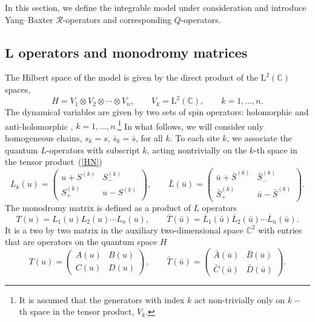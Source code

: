 \documentclass[pdftex]{sigma}
\numberwithin{equation}{section}
\begin{document}
In this section, we define the integrable model under
consideration and introduce Yang--Baxter $\mathcal{R}$-operators
and corresponding $Q$-operators.

\subsection[L operators and monodromy matrices]{$\boldsymbol{L}$ operators and monodromy matrices}

The Hilbert space of the model is given by the direct product of the $\mathrm{L}^2(\mathbb{C})$ spaces,
\begin{equation}\label{HN}
H=V_1\otimes V_2\otimes\cdots\otimes V_n, \qquad V_k=\mathrm{L}^2(\mathbb{C}) ,\qquad
k=1,\dots,n.
\end{equation}
The dynamical variables are given by two sets of spin operators: holomorphic
 and anti-holomorphic
,
$k=1,\dots,n$.\footnote{It is assumed that the
generators with index $k$ act non-trivially
only on $k-$th space in the tensor product, $V_k$.}
In what follows, we will consider only homogeneous chains, $s_k=s$, $\bar s_k=\bar s$, for all $k$.
To each site $k$, we associate the quantum $L$-operators
with subscript $k$, acting nontrivially on the $k$-th space in the tensor product~(\ref{HN})
\begin{equation*}
L_k(u) =
\begin{pmatrix}
u + S^{(k)} & S_{-}^{(k)} \\
S_{+}^{(k)} & u - S^{(k)} \end{pmatrix}, \qquad
\bar L(\bar u) = \begin{pmatrix}
\bar u + \bar S^{(k)} & \bar S_{-}^{(k)}\\
\bar S_{+}^{(k)}& \bar u - \bar S^{(k)}
\end{pmatrix}.
\end{equation*}
The monodromy matrix is defined as a product of $L$ operators
\begin{equation*}
T(u)=L_1(u)L_2(u)\cdots L_n(u), \qquad
 \bar T(\bar u)=\bar L_1(\bar u)\bar L_2(\bar u)\cdots \bar L_n(\bar u) .
\end{equation*}
It is a two by two matrix in the auxiliary two-dimensional space
$\mathbb{C}^2$ with entries that are operators on the quantum space $H$
\begin{equation*}
T(u)
=\begin{pmatrix}
A(u)& B(u)\\
C(u)& D(u)
\end{pmatrix},\qquad
\bar T(\bar u)
 =\begin{pmatrix}
\bar A(\bar u)& \bar B(\bar u)\\
\bar C(\bar u)& \bar D(\bar u)
\end{pmatrix} .
\end{equation*}
\end{document}
